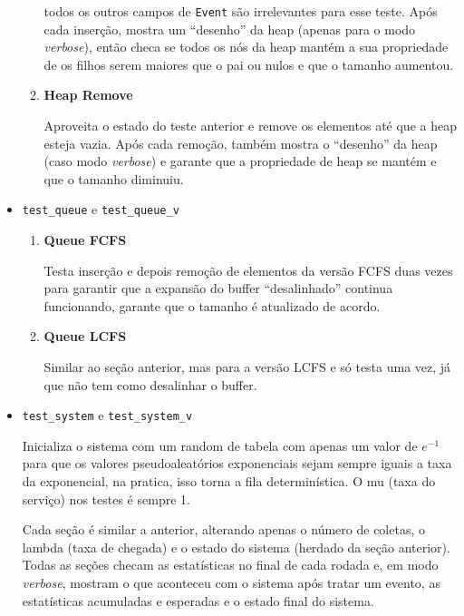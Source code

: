 \documentclass[a4paper]{article}
\newcommand{\inlcode}{\texttt}
\begin{document}
\begin{itemize}
\begin{enumerate}
                todos os outros campos de \inlcode{Event}
                são irrelevantes para esse teste.
                Após cada inserção, mostra um ``desenho'' da heap
                (apenas para o modo \emph{verbose}),
                então checa se todos os nós da heap mantém
                a sua propriedade de os filhos serem maiores
                que o pai ou nulos
                e que o tamanho aumentou.
            \item \textbf{Heap Remove} \par
                Aproveita o estado do teste anterior
                e remove os elementos até que a heap esteja vazia.
                Após cada remoção, também
                mostra o ``desenho'' da heap
                (caso modo \emph{verbose})
                e garante que a propriedade de heap se mantém
                e que o tamanho diminuiu.
        \end{enumerate}
    \item \inlcode{test\_queue} e \inlcode{test\_queue\_v}
        \begin{enumerate}
            \item \textbf{Queue FCFS} \par
                Testa inserção e depois remoção de elementos
                da versão FCFS
                duas vezes para garantir
                que a expansão do buffer ``desalinhado''
                continua funcionando,
                garante que o tamanho é atualizado de acordo.
            \item \textbf{Queue LCFS} \par
                Similar ao seção anterior,
                mas para a versão LCFS
                e só testa uma vez,
                já que não tem como desalinhar o buffer.
        \end{enumerate}
    \item \inlcode{test\_system} e \inlcode{test\_system\_v} \par
        Inicializa o sistema com um random de tabela com
        apenas um valor de \(e^{-1}\) para que
        os valores pseudoaleatórios exponenciais
        sejam sempre iguais a taxa da exponencial,
        na pratica, isso torna a fila determinística.
        O mu (taxa do serviço) nos testes é sempre 1.

        Cada seção é similar a anterior,
        alterando apenas o número de coletas,
        o lambda (taxa de chegada) e
        o estado do sistema (herdado da seção anterior).
        Todas as seções
        checam as estatísticas no final de cada rodada
        e, em modo \emph{verbose},
        mostram o que aconteceu com o sistema após tratar um evento,
        as estatísticas acumuladas e esperadas e
        o estado final do sistema.


\end{itemize}
\end{document}
